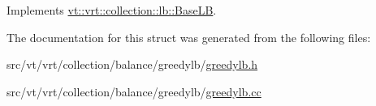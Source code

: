 Implements \hyperlink{structvt_1_1vrt_1_1collection_1_1lb_1_1_base_l_b_a69a398c54f8129f365171a1189ffcd84}{vt\+::vrt\+::collection\+::lb\+::\+Base\+LB}.



The documentation for this struct was generated from the following files\+:\begin{DoxyCompactItemize}
\item 
src/vt/vrt/collection/balance/greedylb/\hyperlink{greedylb_8h}{greedylb.\+h}\item 
src/vt/vrt/collection/balance/greedylb/\hyperlink{greedylb_8cc}{greedylb.\+cc}\end{DoxyCompactItemize}
